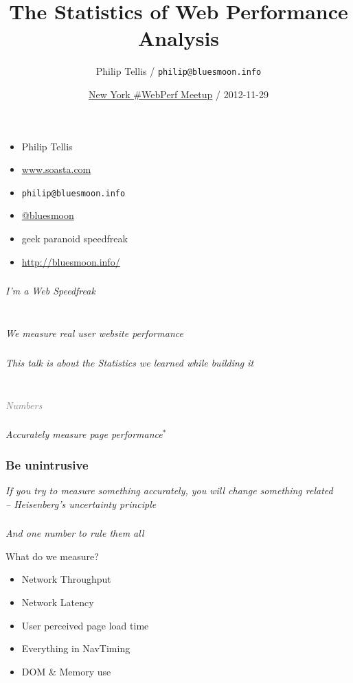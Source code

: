 \documentclass{beamer}
\author{Philip Tellis / \texttt{philip@bluesmoon.info}}
\title{The Statistics of Web Performance Analysis}
\date{\href{http://www.meetup.com/Web-Performance-NY/events/78574902/}{New York \#WebPerf Meetup} / 2012-11-29}
\newcommand{\innersplash}[1]{
  \begin{center}
    \Large \textrm{\textit{ #1 } }
  \end{center}
}
\newcommand{\splashslide}[2][{}]{
  \begin{frame}
  \frametitle{#1}
  \innersplash{#2}
  \end{frame}
}
\newcommand{\leadinslide}[2]{
  \splashslide{
     {\fontsize{150}{20}\selectfont{\raisebox{0pt}[90pt][0pt]{\textcolor{light-gray}{#1}}}} \\ \huge \textcolor{gray}{#2}
  }
}
\begin{document}
\begin{frame}
  \begin{itemize}
  \item Philip Tellis
  \item \href{http://www.soasta.com/}{www.soasta.com}
  \item \small{\texttt{philip@bluesmoon.info}}
  \item \href{http://twitter.com/bluesmoon}{@bluesmoon}
  \item geek paranoid speedfreak
  \item \href{http://bluesmoon.info/}{http://bluesmoon.info/}
  \end{itemize}
\end{frame}

\splashslide{I'm a Web Speedfreak}

\splashslide{ \\ We measure real user website performance}

\splashslide{This talk is about the Statistics we learned while building it}

\begin{frame}
  \titlepage
\end{frame}

\leadinslide{0}{Numbers}

\splashslide{Accurately measure page performance$^{*}$}

\splashslide[Be unintrusive]{If you try to measure something accurately, you will change something related \\ \hfill \tiny{-- Heisenberg's uncertainty principle}}

\splashslide{And one number to rule them all}

\begin{frame}{What do we measure?}
  \begin{itemize}
  \item Network Throughput
  \item Network Latency
  \item User perceived page load time
  \item Everything in NavTiming
  \item DOM \& Memory use
  \end{itemize}
\end{frame}
\end{document}
